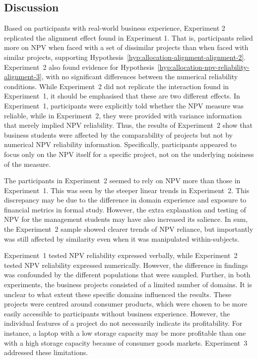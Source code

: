 \documentclass[a4paper, nobind]{templates/ociamthesis}
\theoremstyle{definition}
\theoremstyle{definition}
\theoremstyle{definition}
\theoremstyle{definition}
\theoremstyle{remark}
\begin{document}
\subsection{Discussion}

Based on participants with real-world business experience, Experiment 2
replicated the alignment effect found in Experiment 1. That is, participants
relied more on NPV when faced with a set of dissimilar projects than when faced
with similar projects, supporting
Hypothesis~\ref{hyp:allocation-alignment-alignment-2}. Experiment~2 also found
evidence for Hypothesis~\ref{hyp:allocation-npv-reliability-alignment-3}, with
no significant differences between the numerical reliability conditions. While
Experiment~2 did not replicate the interaction found in Experiment~1, it should
be emphasised that these are two different effects. In Experiment~1,
participants were explicitly told whether the NPV measure was reliable, while in
Experiment~2, they were provided with variance information that merely implied
NPV reliability. Thus, the results of Experiment~2 show that business students
were affected by the comparability of projects but not by numerical NPV
reliability information. Specifically, participants appeared to focus only on
the NPV itself for a specific project, not on the underlying noisiness of the
measure.

The participants in Experiment~2 seemed to rely on NPV more than those in
Experiment~1. This was seen by the steeper linear trends in Experiment~2. This
discrepancy may be due to the difference in domain experience and exposure to
financial metrics in formal study. However, the extra explanation and testing of
NPV for the management students may have also increased its salience. In sum,
the Experiment~2 sample showed clearer trends of NPV reliance, but importantly
was still affected by similarity even when it was manipulated within-subjects.

Experiment~1 tested NPV reliability expressed verbally, while Experiment~2
tested NPV reliability expressed numerically. However, the difference in
findings was confounded by the different populations that were sampled. Further,
in both experiments, the business projects consisted of a limited number of
domains. It is unclear to what extent these specific domains influenced the
results. These projects were centred around consumer products, which were chosen
to be more easily accessible to participants without business experience.
However, the individual features of a project do not necessarily indicate its
profitability. For instance, a laptop with a low storage capacity may be more
profitable than one with a high storage capacity because of consumer goods
markets. Experiment~3 addressed these limitations.
\end{document}
